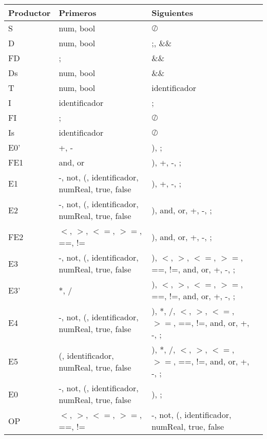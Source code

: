 \begin{tabular}{ |p{2cm}||p{5cm}|p{5cm}|p{0cm}|  }
    \hline
    Productor & Primeros & Siguientes & \\
    \hline
    S & num, bool & $\oslash$ & \\
    D & num, bool & ;, \&\& & \\
    FD & ; & \&\& & \\
    Ds & num, bool & \&\& & \\
    T & num, bool & identificador & \\
    I & identificador & ; & \\
    FI & ; & $\oslash$ & \\
    Is & identificador & $\oslash$ & \\
    E0' & +, - & ), ; & \\
    FE1 & and, or  & ), +, -, ; & \\
    E1 & -, not, (, identificador, numReal, true, false & ), +, -, ; & \\
    E2 & -, not, (, identificador, numReal, true, false & ), and, or, +, -, ; & \\
    FE2 & $<$, $>$, $<=$, $>=$, ==, != & ), and, or, +, -, ; & \\
    E3 & -, not, (, identificador, numReal, true, false & ), $<$, $>$, $<=$, $>=$, ==, !=, and, or, +, -, ; & \\
    E3' & *, / & ), $<$, $>$, $<=$, $>=$, ==, !=, and, or, +, -, ; & \\
    E4 & -, not, (, identificador, numReal, true, false & ), *, /, $<$, $>$, $<=$, $>=$, ==, !=, and, or, +, -, ; & \\
    E5 & (, identificador, numReal, true, false & ), *, /, $<$, $>$, $<=$, $>=$, ==, !=, and, or, +, -, ; & \\
    E0 & -, not, (, identificador, numReal, true, false & ), ; & \\
    OP & $<$, $>$, $<=$, $>=$, ==, != & -, not, (, identificador, numReal, true, false & \\
    \hline
\end{tabular}

